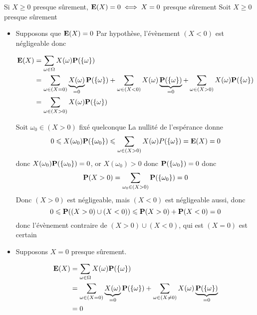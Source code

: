 \documentclass{article}
\begin{document}
\begin{question_kholle}{Si $X \geqslant 0$ presque sûrement, $\mathbf E(X) = 0 \iff X = 0$ presque sûrement}
	Soit $X\geqslant 0$ presque sûrement
	\begin{itemize}
		\item Supposons que $\mathbf E(X) = 0$
		Par hypothèse, l'évènement $(X<0)$ est négligeable donc
		
		\begin{align*}
			\mathbf E (X) & = \sum_{\omega \in \Omega}X(\omega)\mathbf P(\{ \omega \}) \\
			&= \sum_{\omega \in (X = 0)} \underbrace{ X(\omega) }_{ = 0 } \mathbf P(\{ \omega  \}) + \sum_{\omega \in (X<0)}X(\omega) \underbrace{ \mathbf P(\{ \omega \}) }_{ =0 } + \sum_{\omega \in (X >0)} X(\omega)\mathbf P(\{ \omega \}) \\
			&= \sum_{\omega \in (X >0)} X(\omega)\mathbf P(\{ \omega \})
		\end{align*}
		
		Soit $\omega_{0} \in (X>0)$ fixé quelconque
		La nullité de l'espérance donne
		$$0 \leqslant X(\omega_{0})\mathbf P(\{ \omega_{0} \}) \leqslant \sum_{\omega \in(X>0)}X(\omega) P(\{ \omega \})= \mathbf E(X) = 0$$
		donc $X(\omega_{0})\mathbf P(\{ \omega_{0} \}) = 0$, or $X(\omega_{0})>0$ donc $\mathbf P(\{ \omega_{0} \})=0$
		donc 
		$$\mathbf P(X>0) = \sum_{\omega_{0} \in (X>0)} \mathbf P(\{ \omega_{0} \}) = 0$$
		Donc  $(X>0)$ est négligeable, mais $(X<0)$ est négligeable aussi, donc
		$$0\leqslant \mathbf P((X>0) \cup (X<0))\leqslant \mathbf P(X>0) + \mathbf P(X<0)=0$$
		donc l'évènement contraire de $(X>0) \cup (X<0)$, qui est $(X=0)$ est certain
		
		\item Supposons $X=0$ presque sûrement.
		
		\begin{align*}
			\mathbf E(X) &= \sum_{\omega \in \Omega}X(\omega)\mathbf P(\{ \omega \}) \\
			&= \sum_{\omega \in (X = 0)} \underbrace{ X(\omega) }_{ =0 } \mathbf P(\{ \omega \}) + \sum_{\omega \in (X \neq 0)} X(\omega) \underbrace{ \mathbf P(\{ \omega \}) }_{ =0 } \\
			&= 0
		\end{align*}
		
	\end{itemize}
\end{question_kholle}
\end{document}
